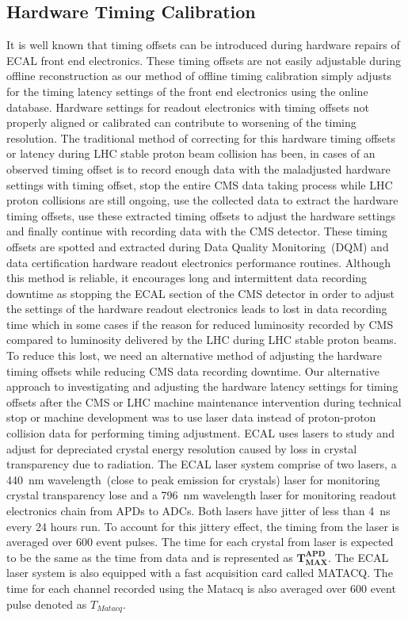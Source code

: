 \subsection{Hardware Timing Calibration}
It is well known that timing offsets can be introduced during hardware repairs of ECAL front end electronics. These timing offsets are not easily adjustable during offline reconstruction as our method of offline timing calibration simply adjusts for the timing latency settings of the front end electronics using the online database. Hardware settings for readout electronics with timing offsets not properly aligned or calibrated can contribute to worsening of the timing resolution. The traditional method of correcting for this hardware timing offsets or latency during LHC stable proton beam collision has been, in cases of an observed timing offset is to record enough data with the maladjusted hardware settings with timing offset, stop the entire CMS data taking process while LHC proton collisions are still ongoing, use the collected data to extract the hardware timing offsets, use these extracted timing offsets to adjust the hardware settings and finally continue with recording data with the CMS detector. These timing offsets are spotted and extracted during Data Quality Monitoring~(DQM) and data certification hardware readout electronics performance routines. Although this method is reliable, it encourages long and intermittent data recording downtime as stopping the ECAL section of the CMS detector in order to adjust the settings of the hardware readout electronics leads to lost in data recording time which in some cases if the reason for reduced luminosity recorded by CMS compared to luminosity delivered by the LHC during LHC stable proton beams. To reduce this lost, we need an alternative method of adjusting the hardware timing offsets while reducing CMS data recording downtime. 
Our alternative approach to investigating and adjusting the hardware latency settings for timing offsets after the CMS or LHC machine maintenance intervention during technical stop or machine development was to use laser data instead of proton-proton collision data for performing timing adjustment. ECAL uses lasers to study and adjust for depreciated crystal energy resolution caused by loss in crystal transparency due to radiation. 
\newline
The ECAL laser system comprise of two lasers, a 440~nm wavelength~(close to peak emission for \pb crystals) laser for monitoring crystal transparency lose and a 796~nm wavelength laser for monitoring readout electronics chain from APDs to ADCs. Both lasers have jitter of less than 4~ns every 24 hours run. To account for this jittery effect, the timing from the laser is averaged over 600 event pulses. The time for each crystal from laser is expected to be the same as the time from data and is represented as $\mathbf{T^{APD}_{MAX}}$. The ECAL laser system is also equipped with a fast acquisition card called MATACQ. The time for each channel recorded using the Matacq is also averaged over 600 event pulse denoted as $ T_{Matacq}$.

